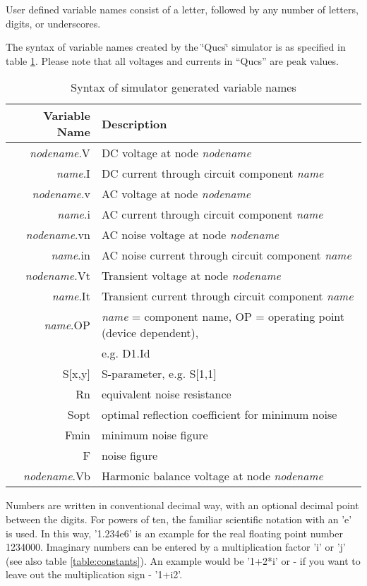 User defined variable names consist of a letter, followed by any number
of letters, digits, or underscores.

The syntax of variable names created by the \char`\"{}Qucs\char`\"{}
simulator is as specified in table \ref{table:var_names}. Please
note that all voltages and currents in {}``Qucs'' are peak values.

%
\begin{table}[ht]
\begin{flushleft}\begin{tabular}{|r|l|}
\hline 
Variable Name&
Description\tabularnewline
\hline
\hline 
\textit{nodename}.V&
DC voltage at node \textit{nodename}\tabularnewline
\hline 
\textit{name}.I&
DC current through circuit component \textit{name}\tabularnewline
\hline 
\textit{nodename}.v&
AC voltage at node \textit{nodename}\tabularnewline
\hline 
\textit{name}.i&
AC current through circuit component \textit{name}\tabularnewline
\hline 
\textit{nodename}.vn&
AC noise voltage at node \textit{nodename}\tabularnewline
\hline 
\textit{name}.in&
AC noise current through circuit component \textit{name}\tabularnewline
\hline 
\textit{nodename}.Vt&
Transient voltage at node \textit{nodename}\tabularnewline
\hline 
\textit{name}.It&
Transient current through circuit component \textit{name}\tabularnewline
\hline
\textit{name}.OP&
\textit{name} = component name, OP = operating point (device dependent),\tabularnewline
&
 e.g. D1.Id\tabularnewline
\hline
S{[}x,y{]}&
S-parameter, e.g. S{[}1,1{]}\tabularnewline
\hline
Rn&
equivalent noise resistance\tabularnewline
\hline
Sopt&
optimal reflection coefficient for minimum noise\tabularnewline
\hline
Fmin&
minimum noise figure\tabularnewline
\hline
F &
noise figure\tabularnewline
\hline
\textit{nodename}.Vb&
Harmonic balance voltage at node \textit{nodename}\tabularnewline
\hline 
\end{tabular}\end{flushleft}


\caption{\label{table:var_names}Syntax of simulator generated variable names}
\end{table}




Numbers are written in conventional decimal way, with an optional
decimal point between the digits. For powers of ten, the familiar
scientific notation with an 'e' is used. In this way, '1.234e6' is an
example for the real floating point number 1234000. Imaginary numbers
can be entered by a multiplication factor 'i' or 'j' (see also table
\ref{table:constants}).  An example would be '1+2{*}i' or - if you
want to leave out the multiplication sign - '1+i2'.


